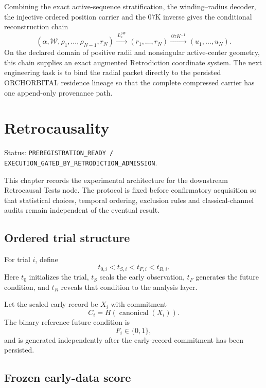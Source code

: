 Combining the exact active-sequence stratification, the winding--radius decoder, the injective ordered position carrier and the 07K inverse gives the conditional reconstruction chain
\[
\boxed{
(\alpha,\mathcal W,\rho_1,\ldots,\rho_{N-1},r_N)
\xrightarrow{\ L_s^{\rho W}\ }
(r_1,\ldots,r_N)
\xrightarrow{\ 07K^{-1}\ }
(u_1,\ldots,u_N).
}
\]
On the declared domain of positive radii and nonsingular active-center geometry, this chain supplies an exact augmented Retrodiction coordinate system. The next engineering task is to bind the radial packet directly to the persisted ORCHORBITAL residence lineage so that the complete compressed carrier has one append-only provenance path.


\chapter{Retrocausality}

Status: \texttt{PREREGISTRATION\_READY / EXECUTION\_GATED\_BY\_RETRODICTION\_ADMISSION}.

This chapter records the experimental architecture for the downstream Retrocausal Tests node. The protocol is fixed before confirmatory acquisition so that statistical choices, temporal ordering, exclusion rules and classical-channel audits remain independent of the eventual result.

\section{Ordered trial structure}

For trial $i$, define
\[
\boxed{t_{0,i}<t_{S,i}<t_{F,i}<t_{R,i}.}
\]
Here $t_0$ initializes the trial, $t_S$ seals the early observation, $t_F$ generates the future condition, and $t_R$ reveals that condition to the analysis layer.

Let the sealed early record be $X_i$ with commitment
\[
\boxed{C_i=H(\operatorname{canonical}(X_i)).}
\]
The binary reference future condition is
\[
F_i\in\{0,1\},
\]
and is generated independently after the early-record commitment has been persisted.

\section{Frozen early-data score}

